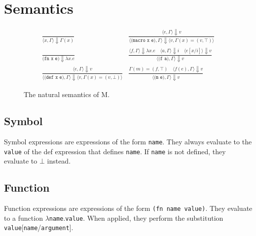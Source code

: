 \documentclass[11pt]{article}
\begin{document}
    \section{Semantics}\label{sec:semantics}

    \begin{figure*}[h]
        \centering
        \begin{align*}
            &\frac{\;}{\langle x,\Gamma\rangle\Downarrow\Gamma(x)}
            &\frac{\langle e,\Gamma\rangle\Downarrow v}{\langle\texttt{(macro x e)},\Gamma\rangle\Downarrow\langle v,\Gamma(x) = (v,\top)\rangle}&  \\
            &\frac{\;}{\texttt{(fn x e)}\Downarrow\lambda x.e}
            &\frac{\langle f,\Gamma\rangle\Downarrow\lambda x.e\quad\langle a,\Gamma\rangle\Downarrow i\quad\langle e[x/i]\rangle\Downarrow v}{\langle\texttt{(f a)},\Gamma\rangle\Downarrow v}&\\
            &\frac{\langle e,\Gamma\rangle\Downarrow v}{\langle\texttt{(def x e)},\Gamma\rangle\Downarrow\langle v,\Gamma(x) = (v,\bot)\rangle}
            &\frac{\Gamma(m)=(f,\top)\quad\langle f(e),\Gamma\rangle\Downarrow v}{\langle\texttt{(m e)},\Gamma\rangle\Downarrow v}&
        \end{align*}
        \caption{The natural semantics of M.}
    \end{figure*}

    \subsection{Symbol}\label{subsec:symbol}

    \begin{minipage}{\columnwidth}
        Symbol expressions are expressions of the form \texttt{name}.
        They always evaluate to the \texttt{value} of the def expression that defines \texttt{name}.
        If \texttt{name} is not defined, they evaluate to $\bot$ instead.
    \end{minipage}

    \subsection{Function}\label{subsec:function}

    \begin{minipage}{\columnwidth}
        Function expressions are expressions of the form \lstinline{(fn name value)}.
        They evaluate to a function $\lambda$\texttt{name}.\texttt{value}.
        When applied, they perform the substitution \texttt{value}[\texttt{name}/\texttt{argument}].
    \end{minipage}
\end{document}
